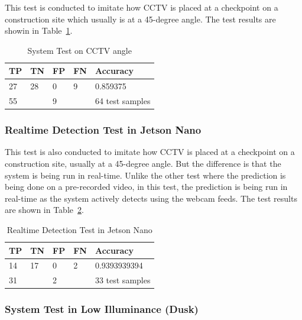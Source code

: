 \par This test is conducted to imitate how CCTV is placed at a checkpoint on a construction site which usually is at a 45-degree angle. The test results are showin in Table~\ref{tb:systest_cctv}.

\begin{table}
  \centering
  \caption{System Test on CCTV angle}
  \label{tb:systest_cctv}
  \begin{tabular}{|l|l|l|l|l|} 
  \hline
  TP & TN & FP & FN & Accuracy         \\ 
  \hline
  27 & 28 & 0  & 9  & 0.859375         \\ 
  \hline
  \multicolumn{2}{|l|}{55}   & \multicolumn{2}{l|}{9} & 64 test samples  \\
  \hline
  \end{tabular}
\end{table}


\subsubsection{Realtime Detection Test in Jetson Nano}
\label{subsubsec:hedect_test_cctv_jetsonanno}

\par This test is also conducted to imitate how CCTV is placed at a checkpoint on a construction site, usually at a 45-degree angle. But the difference is that the system is being run in real-time. Unlike the other test where the prediction is being done on a pre-recorded video, in this test, the prediction is being run in real-time as the system actively detects using the webcam feeds. The test results are shown in Table~\ref{tb:systest_jetsonnano}.

\begin{table}
  \centering
  \caption{Realtime Detection Test in Jetson Nano}
  \label{tb:systest_jetsonnano}
  \begin{tabular}{|l|l|l|l|l|} 
  \hline
  TP & TN                    & FP & FN                & Accuracy         \\ 
  \hline
  14 & 17                    & 0  & 2                 & 0.9393939394     \\ 
  \hline
  \multicolumn{2}{|l|}{31}   & \multicolumn{2}{l|}{2} & 33 test samples  \\
  \hline
  \end{tabular}
\end{table}

\subsubsection{System Test in Low Illuminance (Dusk)}
\label{subsubsec:hedect_test_lowillum_dusk}

